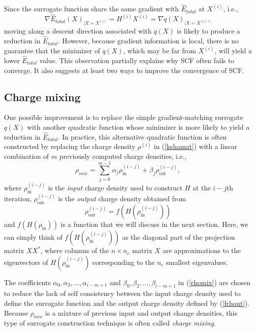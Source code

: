\documentclass[11pt]{book}
\newcommand{\exi} {X^{(i)}}
\newcommand{\Hi} {H^{(i)}}
\newcommand{\hEtot}{\hat{E}_{total}}
\newcommand{\rhoi}{\rho^{(i)}}
\newcommand{\rhoin}{\rho_{\mbox{in}}}
\newcommand{\rhout}{\rho_{\mbox{out}}}
\begin{document}
Since the surrogate function share the same gradient with $\hat{E}_{total}$ at
$X^{(i)}$, i.e.,
\[
\nabla \hEtot (X)_{|X=X^{(i)}} 
= \Hi X^{(i)} = \nabla q(X)_{|X=X^{(i)}},
\]
moving along a descent direction associated with $q(X)$ is likely to produce a
reduction in $\hat{E}_{total}$.  However, because gradient information
is local, there is no guarantee that the minimizer of $q(X)$, which may 
be far from $\exi$, will yield a lower $\hEtot$ value. This observation
partially explains why SCF often fails to converge. It also suggests
at least two ways to improve the convergence of SCF.

\subsection{Charge mixing}
One possible improvement is to replace the simple gradient-matching 
surrogate $q(X)$ with another quadratic function whose minimizer is 
more likely to yield a reduction in $\hEtot$.  In practice, this alternative 
quadratic function is often constructed by replacing the charge density 
$\rhoi$ in (\ref{kshamat}) with a linear combination of $m$ previously
computed charge densities, i.e.,
\begin{equation}
\rho_{mix} = \sum_{j=0}^{m-1} \alpha_j \rhoin^{(i-j)}
+ \beta_j \rhout^{(i-j)}, \label{rhomix}
\end{equation}
where $\rhoin^{(i-j)}$ is the {\em input} charge density used
to construct $H$ at the $i-j$th iteration, 
$\rhout^{(i-j)}$ is the {\em output} charge density 
obtained from 
\begin{equation}
\rhout^{(i-j)} = f(H(\rhoin^{(i-j)})) \label{frhout}
\end{equation}
and $f(H(\rhoin))$ is a function that we will discuss in the next section.
Here, we can simply think of $f(H(\rhoin^{(i-j)}))$ as the diagonal
part of the projection matrix $XX^{\ast}$, where columns of the $n \times n_e$
matrix $X$ are approximations to the eigenvectors of $H(\rhoin^{(i-j)})$
corresponding to the $n_e$ smallest eigenvalues.

The coefficients $\alpha_0, \alpha_2, ..., \alpha_{i-m+1}$ and
$\beta_0, \beta_2, ..., \beta_{i-m+1}$ in (\ref{rhomix}) are chosen 
to reduce the lack of self consistency between the input charge
density used to define the surrogate function and the output charge density
defined by (\ref{frhout}).  Because $\rho_{mix}$ is a mixture of 
previous input and output change densities, this type of 
surrogate construction technique is often called {\em charge mixing}. 
\end{document}

